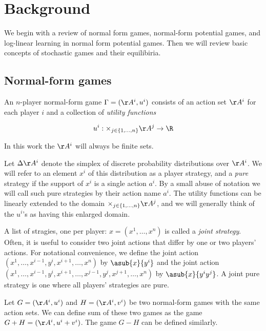 \section{Background}

We begin with a review of normal form games, normal-form potential games, and log-linear learning in normal form potential games. Then we will review basic concepts of stochastic games and their equilibiria.

\subsection{Normal-form games}

\begin{mydef} An $n$-player normal-form game $\Gamma = (\AA^i, u^i)$ consists of an action set $\AA^i$ for each player $i$ and a collection of {\em utility functions}

$$
u^i: \times_{j \in \{1, \ldots, n\}} \AA^j \rightarrow \R
$$
\end{mydef}

In this work the $\AA^i$ will always be finite sets. 

Let $\Delta \AA^i$ denote the simplex of discrete probability distributions over $\AA^i$. We will refer to an element $x^i$ of this distribution as a player strategy, and a {\em pure} strategy if the support of $x^i$ is a single action $a^i$. By a small abuse of notation we will call such pure strategies by their action name $a^i$. The utility functions can be linearly extended to the domain $\times_{j \in \{1, \ldots, n\}}  \AA^j$, and we will generally think of the $u^i$'s as having this enlarged domain.

A list of stragies, one per player: $x = (x^1, \ldots, x^n)$ is called a {\em joint strategy}. Often, it is useful to consider two joint actions that differ by one or two players' actions. For notational convenience, we define the joint action $(x^1, \ldots , x^{i-1}, y^i, x^{i+1}, \ldots, x^n)$ by $\asub{x}{y^i}$ and the joint action $(x^1, \ldots , x^{i-1}, y^i, x^{i+1}, \ldots, x^{j-1}, y^j, x^{j+1}, \ldots,  x^n)$ by $\asub{x}{y^iy^j}$. A joint pure strategy is one where all players' strategies are pure.

Let $G = (\AA^i, u^i)$ and $H = (\AA^i, v^i)$ be two normal-form games with the same action sets. We can define sum of these two games as the game $G + H = (\AA^i, u^i + v^i)$. The game $G - H$ can be defined similarly.



